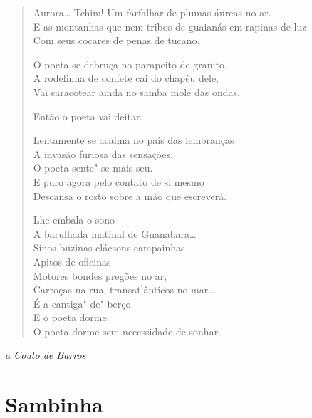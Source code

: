 \begin{verse}
Aurora\ldots{} Tchim! Um farfalhar de plumas áureas no ar.\\
E as montanhas que nem tribos de guaianás em rapinas de luz\\
Com seus cocares de penas de tucano.

O poeta se debruça no parapeito de granito.\\
A rodelinha de confete cai do chapéu dele,\\
Vai saracotear ainda no samba mole das ondas.

Então o poeta vai deitar.

Lentamente se acalma no país das lembranças\\
A invasão furiosa das sensações.\\
O poeta sente"-se mais seu.\\
E puro agora pelo contato de si mesmo\\
Descansa o rosto sobre a mão que escreverá.

Lhe embala o sono\\
A barulhada matinal de Guanabara\ldots{}\\
Sinos buzinas clácsons campainhas\\
Apitos de oficinas\\
Motores bondes pregões no ar,\\
Carroças na rua, transatlânticos no mar\ldots{}\\
É a cantiga"-de"-berço.\\
E o poeta dorme.\\

O poeta dorme sem necessidade de sonhar.
\end{verse}


\hfill\emph{a Couto de Barros}

\section{Sambinha}

